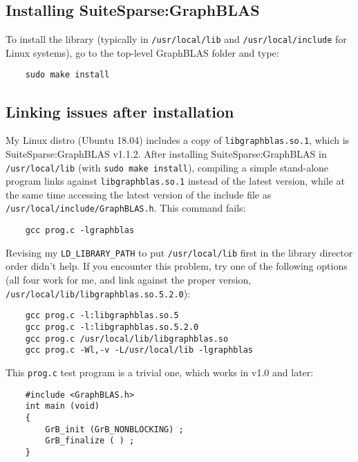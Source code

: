 \documentclass[12pt]{article}
\begin{document}
\subsection{Installing SuiteSparse:GraphBLAS}

To install the library (typically in \verb'/usr/local/lib' and
\verb'/usr/local/include' for Linux systems), go to the top-level GraphBLAS
folder and type:

    {\small
    \begin{verbatim}
    sudo make install \end{verbatim} }

\subsection{Linking issues after installation}

My Linux distro (Ubuntu 18.04) includes a copy of \verb'libgraphblas.so.1',
which is SuiteSparse:GraphBLAS v1.1.2.  After installing SuiteSparse:GraphBLAS
in \verb'/usr/local/lib' (with \verb'sudo make install'), compiling a simple
stand-alone program links against \verb'libgraphblas.so.1' instead of the
latest version, while at the same time accessing the latest version of the
include file as \verb'/usr/local/include/GraphBLAS.h'.  This command fails:

    {\small
    \begin{verbatim}
    gcc prog.c -lgraphblas \end{verbatim} }

Revising my \verb'LD_LIBRARY_PATH' to put \verb'/usr/local/lib' first in the
library director order didn't help.  If you encounter this problem, try one of
the following options (all four work for me, and link against the proper
version, \verb'/usr/local/lib/libgraphblas.so.5.2.0'):

    {\small
    \begin{verbatim}
    gcc prog.c -l:libgraphblas.so.5
    gcc prog.c -l:libgraphblas.so.5.2.0
    gcc prog.c /usr/local/lib/libgraphblas.so
    gcc prog.c -Wl,-v -L/usr/local/lib -lgraphblas \end{verbatim} }

This \verb'prog.c' test program is a trivial one, which works in v1.0 and
later:

    {\small
    \begin{verbatim}
    #include <GraphBLAS.h>
    int main (void)
    {
        GrB_init (GrB_NONBLOCKING) ;
        GrB_finalize ( ) ;
    } \end{verbatim} }
\end{document}
